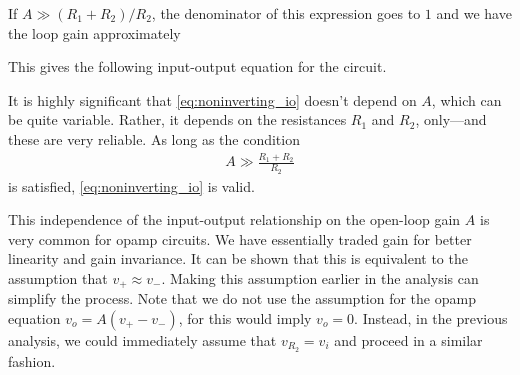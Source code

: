 \documentclass[electronics.tex]{subfiles}
\begin{document}
If $A\gg (R_1 + R_2)/R_2$, the denominator of this expression goes to $1$ and we have the loop gain approximately

%

This gives the following input-output equation for the circuit.
%

It is highly significant that \autoref{eq:noninverting_io} doesn't depend on $A$, which can be quite variable.
Rather, it depends on the resistances $R_1$ and $R_2$, only---and these are very reliable.
As long as the condition
\begin{align}
	A\gg\frac{R_1 + R_2}{R_2}
\end{align}
is satisfied, \autoref{eq:noninverting_io} is valid.

This independence of the input-output relationship on the open-loop gain $A$ is very common for opamp circuits.
We have essentially traded gain for better linearity and gain invariance.
It can be shown that this is equivalent to the assumption that $v_+ \approx v_-$.
Making this assumption earlier in the analysis can simplify the process.
Note that we do not use the assumption for the opamp equation $v_o = A (v_+ - v_-)$, for this would imply $v_o = 0$. 
Instead, in the previous analysis, we could immediately assume that $v_{R_2} = v_i$ and proceed in a similar fashion.
\tags{}

\begin{exercises}

\end{exercises}
\end{document}
